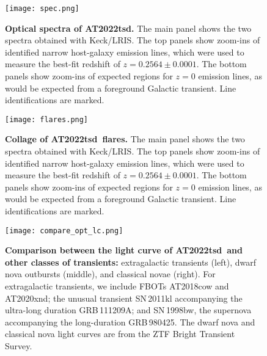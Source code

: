 \documentclass{nature_plusfigure}
\newcommand{\at}{AT2022tsd}
\begin{document}
\begin{extended_data}

\renewcommand{\thefigure}{\arabic{figure}~Extended~Data}
\renewcommand{\thefigure}{Extended Data Figure \arabic{figure}}
\renewcommand{\figurename}{}
\setcounter{figure}{0}

\renewcommand{\thetable}{\arabic{table}~Extended~Data}
\renewcommand{\thetable}{Extended Data Table \arabic{table}}
\renewcommand{\tablename}{}
\setcounter{table}{0}

\begin{figure}[ht]
 \centering
\texttt{[image: spec.png]}
  \caption{\textbf{Optical spectra of \at.} The main panel shows the two spectra obtained with Keck/LRIS. The top panels show zoom-ins of identified narrow host-galaxy emission lines, which were used to measure the best-fit redshift of $z=0.2564\pm0.0001$. The bottom panels show zoom-ins of expected regions for $z=0$ emission lines, as would be expected from a foreground Galactic transient. Line identifications are marked.}
 \label{fig:spec}
\end{figure}

\begin{figure}[ht]
 \centering
\texttt{[image: flares.png]}
  \caption{\textbf{Collage of \at\ flares.} The main panel shows the two spectra obtained with Keck/LRIS. The top panels show zoom-ins of identified narrow host-galaxy emission lines, which were used to measure the best-fit redshift of $z=0.2564\pm0.0001$. The bottom panels show zoom-ins of expected regions for $z=0$ emission lines, as would be expected from a foreground Galactic transient. Line identifications are marked.}
 \label{fig:flare-collage}
\end{figure}

\begin{figure}[ht]
 \centering
\texttt{[image: compare\_opt\_lc.png]}
  \caption{\textbf{Comparison between the light curve of \at\ and other classes of transients:} extragalactic transients (left), dwarf nova outbursts (middle), and classical novae (right). For extragalactic transients, we include FBOTs AT2018cow\cite{Perley2019} and AT2020xnd\cite{Perley2021}; the unusual transient SN\,2011kl accompanying the ultra-long duration GRB\,111209A; and SN\,1998bw, the supernova accompanying the long-duration GRB\,980425. The dwarf nova and classical nova light curves are from the ZTF Bright Transient Survey\cite{Perley2020}.}
 \label{fig:opt-lc-comparison}
\end{figure}


\end{extended_data}
\end{document}

